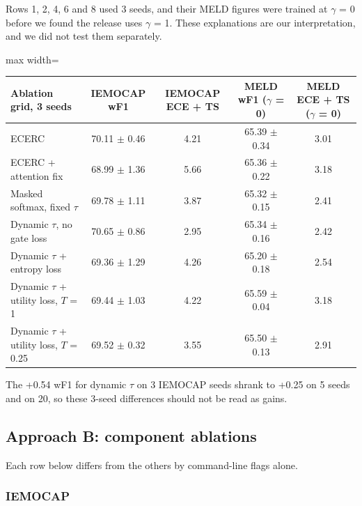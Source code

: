 \documentclass[11pt,a4paper]{article}
\newcommand{\mn}{\textminus}
\begin{document}
Rows 1, 2, 4, 6 and 8 used 3 seeds, and their MELD figures were trained at $\gamma$ = 0 before we found the release uses $\gamma$ = 1. These explanations are our interpretation, and we did not test them separately.

\begin{center}
\begin{adjustbox}{max width=\linewidth}
\begin{tabular}{lcccc}
\toprule
Ablation grid, 3 seeds & IEMOCAP wF1 & IEMOCAP ECE + TS & MELD wF1 ($\gamma$ = 0) & MELD ECE + TS ($\gamma$ = 0) \\
\midrule
ECERC & 70.11 $\pm$ 0.46 & 4.21 & 65.39 $\pm$ 0.34 & 3.01 \\
ECERC + attention fix & 68.99 $\pm$ 1.36 & 5.66 & 65.36 $\pm$ 0.22 & 3.18 \\
Masked softmax, fixed $\tau$ & 69.78 $\pm$ 1.11 & 3.87 & 65.32 $\pm$ 0.15 & 2.41 \\
Dynamic $\tau$, no gate loss & 70.65 $\pm$ 0.86 & 2.95 & 65.34 $\pm$ 0.16 & 2.42 \\
Dynamic $\tau$ + entropy loss & 69.36 $\pm$ 1.29 & 4.26 & 65.20 $\pm$ 0.18 & 2.54 \\
Dynamic $\tau$ + utility loss, $T$ = 1 & 69.44 $\pm$ 1.03 & 4.22 & 65.59 $\pm$ 0.04 & 3.18 \\
Dynamic $\tau$ + utility loss, $T$ = 0.25 & 69.52 $\pm$ 0.32 & 3.55 & 65.50 $\pm$ 0.13 & 2.91 \\
\bottomrule
\end{tabular}
\end{adjustbox}
\end{center}

The +0.54 wF1 for dynamic $\tau$ on 3 IEMOCAP seeds shrank to +0.25 on 5 seeds and \mn0.12 on 20, so these 3-seed differences should not be read as gains.

\subsection{Approach B: component ablations}
\label{sec:abl-b}

Each row below differs from the others by command-line flags alone.

\subsubsection{IEMOCAP}
\end{document}
